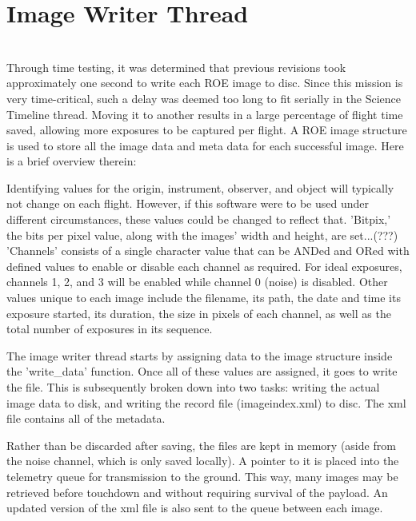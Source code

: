 %
\section{Image Writer Thread}
\hrulefill
\\

Through time testing, it was determined that previous revisions took approximately one second to write each ROE image to disc. Since this mission is very time-critical, such a delay was deemed too long to fit serially in the Science Timeline thread. Moving it to another results in a large percentage of flight time saved, allowing more exposures to be captured per flight.
A ROE image structure is used to store all the image data and meta data for each successful image. Here is a brief overview therein:

Identifying values for the origin, instrument, observer, and object will typically not change on each flight. However, if this software were to be used under different circumstances, these values could be changed to reflect that. 'Bitpix,' the bits per pixel value, along with the images' width and height, are set...(???) 'Channels' consists of a single character value that can be ANDed and ORed with defined values to enable or disable each channel as required. For ideal exposures, channels 1, 2, and 3 will be enabled while channel 0 (noise) is disabled. Other values unique to each image include the filename, its path, the date and time its exposure started, its duration, the size in pixels of each channel, as well as the total number of exposures in its sequence.  

The image writer thread starts by assigning data to the image structure inside the 'write\_data' function. Once all of these values are assigned, it goes to write the file. This is subsequently broken down into two tasks: writing the actual image data to disk, and writing the record file (imageindex.xml) to disc. The xml file contains all of the metadata. 

Rather than be discarded after saving, the files are kept in memory (aside from the noise channel, which is only saved locally). A pointer to it is placed into the telemetry queue for transmission to the ground. This way, many images may be retrieved before touchdown and without requiring survival of the payload. An updated version of the xml file is also sent to the queue between each image.

